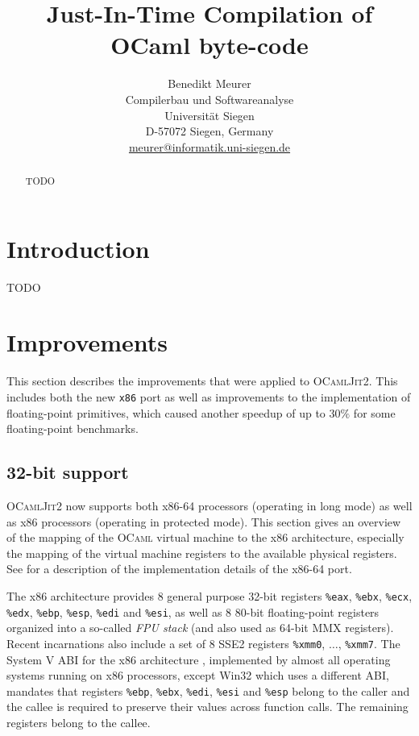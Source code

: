 \documentclass[12pt,a4paper,final]{article}
\begin{document}
\title{%
  Just-In-Time Compilation of OCaml byte-code
}
\author{%
  Benedikt Meurer\\
  Compilerbau und Softwareanalyse\\
  Universit\"at Siegen\\
  D-57072 Siegen, Germany\\
  \url{meurer@informatik.uni-siegen.de}
}
\date{}
\maketitle
\begin{abstract}
  TODO
\end{abstract}


\section{Introduction}

TODO


\section{Improvements} \label{section:Improvements}

This section describes the improvements that were applied to \textsc{OCamlJit2}. This
includes both the new \texttt{x86} port as well as improvements to the implementation
of floating-point primitives, which caused another speedup of up to $30\%$ for some
floating-point benchmarks.

\subsection{32-bit support}

\textsc{OCamlJit2} now supports both x86-64 processors (operating in long mode)
as well as x86 processors (operating in protected mode). This section gives an
overview of the mapping of the \textsc{OCaml} virtual machine to the x86
architecture, especially the mapping of the virtual machine registers to the available
physical registers. See \cite{Meurer10:OCamlJit2.0} for a description of the implementation
details of the x86-64 port.

The x86 architecture \cite{Intel10Vol1} provides $8$ general purpose 32-bit registers
\texttt{\%eax}, \texttt{\%ebx}, \texttt{\%ecx}, \texttt{\%edx}, \texttt{\%ebp}, \texttt{\%esp},
\texttt{\%edi} and \texttt{\%esi}, as well as $8$ 80-bit floating-point registers organized
into a so-called \emph{FPU stack} (and also used as 64-bit MMX registers). Recent incarnations also
include a set of $8$ SSE2 registers \texttt{\%xmm0}, $\ldots$, \texttt{\%xmm7}.
The System V ABI for the x86 architecture \cite{SCO97Abi386}, implemented by almost all
operating systems running on x86 processors, except Win32 which uses a different ABI,
mandates that registers \texttt{\%ebp}, \texttt{\%ebx}, \texttt{\%edi}, \texttt{\%esi}
and \texttt{\%esp} belong to the caller and the callee is required to preserve their
values across function calls. The remaining registers belong to the callee.
\end{document}
